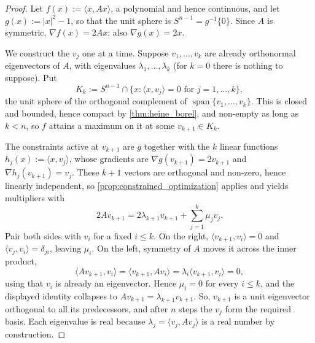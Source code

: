 \begin{proof}
Let $f(x) := \langle x, Ax\rangle$, a polynomial and hence continuous, and let
$g(x) := \lvert x\rvert^2 - 1$, so that the unit sphere is $S^{n-1} = g^{-1}\{0\}$. Since $A$ is
symmetric, $\nabla f(x) = 2Ax$; also $\nabla g(x) = 2x$.

We construct the $v_j$ one at a time. Suppose $v_1,\dots,v_k$ are already orthonormal
eigenvectors of $A$, with eigenvalues $\lambda_1,\dots,\lambda_k$ (for $k=0$ there is nothing to
suppose). Put
\[K_k := S^{n-1} \cap \{x : \langle x,v_j\rangle = 0 \text{ for } j=1,\dots,k\},\]
the unit sphere of the orthogonal complement of $\operatorname{span}\{v_1,\dots,v_k\}$. This is
closed and bounded, hence compact by \cref{thm:heine_borel}, and non-empty as long as $k<n$, so
$f$ attains a maximum on it at some $v_{k+1} \in K_k$.

The constraints active at $v_{k+1}$ are $g$ together with the $k$ linear functions
$h_j(x) := \langle x,v_j\rangle$, whose gradients are $\nabla g(v_{k+1}) = 2v_{k+1}$ and
$\nabla h_j(v_{k+1}) = v_j$. These $k+1$ vectors are orthogonal and non-zero, hence linearly
independent, so \cref{prop:constrained_optimization} applies and yields multipliers with
\[2Av_{k+1} = 2\lambda_{k+1}v_{k+1} + \sum_{j=1}^{k}\mu_jv_j.\]
Pair both sides with $v_i$ for a fixed $i \leq k$. On the right, $\langle v_{k+1},v_i\rangle = 0$
and $\langle v_j,v_i\rangle = \delta_{ji}$, leaving $\mu_i$. On the left, symmetry of $A$ moves it
across the inner product,
\[\langle Av_{k+1}, v_i\rangle = \langle v_{k+1}, Av_i\rangle
  = \lambda_i\langle v_{k+1},v_i\rangle = 0,\]
using that $v_i$ is already an eigenvector. Hence $\mu_i = 0$ for every $i \leq k$, and the
displayed identity collapses to $Av_{k+1} = \lambda_{k+1}v_{k+1}$. So, $v_{k+1}$ is a unit
eigenvector orthogonal to all its predecessors, and after $n$ steps the $v_j$ form the required
basis. Each eigenvalue is real because $\lambda_j = \langle v_j, Av_j\rangle$ is a real number by
construction.
\end{proof}


